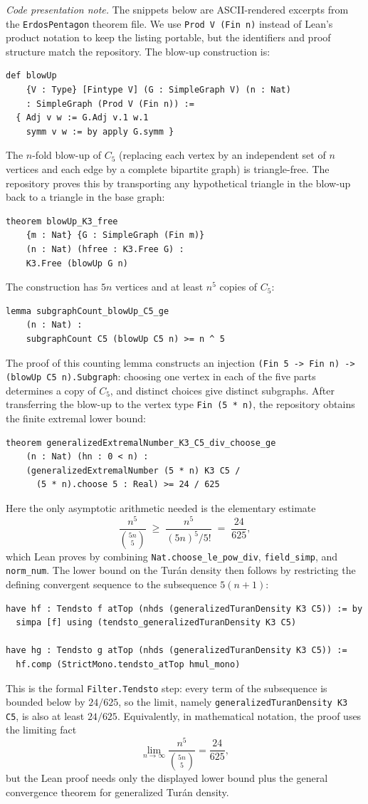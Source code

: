 \documentclass{article}
\newcommand{\lean}[1]{\texttt{#1}}
\begin{document}
\emph{Code presentation note.}  The snippets below are ASCII-rendered excerpts
from the \lean{ErdosPentagon} theorem file.  We use
\lean{Prod V (Fin n)} instead of Lean's product notation to keep the listing
portable, but the identifiers and proof structure match the repository.
The blow-up construction is:
\begin{lstlisting}
def blowUp
    {V : Type} [Fintype V] (G : SimpleGraph V) (n : Nat)
    : SimpleGraph (Prod V (Fin n)) :=
  { Adj v w := G.Adj v.1 w.1
    symm v w := by apply G.symm }
\end{lstlisting}
The $n$-fold blow-up of $C_5$ (replacing each vertex by an independent set
of $n$ vertices and each edge by a complete bipartite graph) is triangle-free.
The repository proves this by transporting any hypothetical triangle in the
blow-up back to a triangle in the base graph:
\begin{lstlisting}
theorem blowUp_K3_free
    {m : Nat} {G : SimpleGraph (Fin m)}
    (n : Nat) (hfree : K3.Free G) :
    K3.Free (blowUp G n)
\end{lstlisting}
The construction has $5n$ vertices and at least $n^5$ copies of $C_5$:
\begin{lstlisting}
lemma subgraphCount_blowUp_C5_ge
    (n : Nat) :
    subgraphCount C5 (blowUp C5 n) >= n ^ 5
\end{lstlisting}
The proof of this counting lemma constructs an injection
\lean{(Fin 5 -> Fin n) -> (blowUp C5 n).Subgraph}: choosing one vertex in each
of the five parts determines a copy of $C_5$, and distinct choices give
distinct subgraphs.  After transferring the blow-up to the vertex type
\lean{Fin (5 * n)}, the repository obtains the finite extremal lower bound:
\begin{lstlisting}
theorem generalizedExtremalNumber_K3_C5_div_choose_ge
    (n : Nat) (hn : 0 < n) :
    (generalizedExtremalNumber (5 * n) K3 C5 /
      (5 * n).choose 5 : Real) >= 24 / 625
\end{lstlisting}
Here the only asymptotic arithmetic needed is the elementary estimate
\[
  \frac{n^5}{\binom{5n}{5}}
  \;\geq\;
  \frac{n^5}{(5n)^5 / 5!}
  \;=\;
  \frac{24}{625},
\]
which Lean proves by combining \lean{Nat.choose\_le\_pow\_div},
\lean{field\_simp}, and \lean{norm\_num}.  The lower bound on the Turán
density then follows by restricting the defining convergent sequence to the
subsequence $5(n+1)$:
\begin{lstlisting}
have hf : Tendsto f atTop (nhds (generalizedTuranDensity K3 C5)) := by
  simpa [f] using (tendsto_generalizedTuranDensity K3 C5)

have hg : Tendsto g atTop (nhds (generalizedTuranDensity K3 C5)) :=
  hf.comp (StrictMono.tendsto_atTop hmul_mono)
\end{lstlisting}
This is the formal \lean{Filter.Tendsto} step: every term of the subsequence is
bounded below by $24/625$, so the limit, namely
\lean{generalizedTuranDensity K3 C5}, is also at least $24/625$.
Equivalently, in mathematical notation, the proof uses the limiting fact
\[
  \lim_{n\to\infty} \frac{n^5}{\binom{5n}{5}} = \frac{24}{625},
\]
but the Lean proof needs only the displayed lower bound plus the general
convergence theorem for generalized Turán density.
\end{document}
